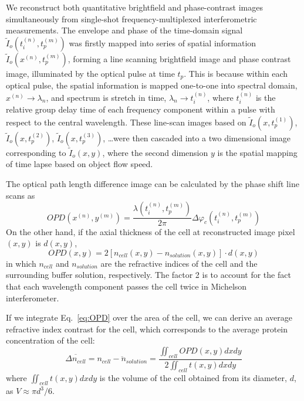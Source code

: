 \documentclass[aps,pra,reprint,longbibliography,superscriptaddress]{revtex4-1}
\begin{document}
We reconstruct both quantitative brightfield and phase-contrast images simultaneously from single-shot frequency-multiplexed interferometric measurements. The envelope and phase of the time-domain signal $\tilde{I}_o (t_i^{(n)}, t_p^{(m)})$ was firstly mapped into series of spatial information $\tilde{I}_o(x^{(n)},t_p^{(m)})$, forming a line scanning brightfield image and phase contrast image, illuminated by the optical pulse at time $t_p$. This is because within each optical pulse, the spatial information is mapped one-to-one into spectral domain, $x^{(n)} \rightarrow \lambda_n$, and spectrum is stretch in time, $\lambda_n \rightarrow t_i^{(n)}$, where $t_i^{(n)}$ is the relative group delay time of each frequency component within a pulse with respect to the central wavelength. These line-scan images based on $\tilde{I}_o(x,t_p^{(1)})$, $\tilde{I}_o (x, t_p^{(2)})$, $\tilde{I}_o(x,t_p^{(3)})$, \ldots were then cascaded into a two dimensional image corresponding to $\tilde{I}_o(x,y)$, where the second dimension $y$ is the spatial mapping of time lapse based on object flow speed. 

The optical path length difference image can be calculated by the phase shift line scans as
\begin{equation}
OPD(x^{(n)},y^{(m)}) = \frac{\lambda(t_i^{(n)},t_p^{(m)})}{2\pi} \Delta\varphi_c(t_i^{(n)},t_p^{(m)})
\end{equation}
On the other hand, if the axial thickness of the cell at reconstructed image pixel $(x,y)$ is $d(x,y)$,
\begin{equation} \label{eq:OPD}
OPD(x,y) = 2 [n_{cell}(x,y) - n_{solution}(x,y)] \cdot d(x,y)
\end{equation}
in which $n_{cell}$ and $n_{solution}$ are the refractive indices of the cell and the surrounding buffer solution, respectively. The factor 2 is to account for the fact that each wavelength component passes the cell twice in Michelson interferometer. 

If we integrate Eq.~\ref{eq:OPD} over the area of the cell, we can derive an average refractive index contrast for the cell, which corresponds to the average protein concentration of the cell:
\begin{equation}
\overline{\Delta n_{cell}} = \overline{n_{cell} - n_{solution}} = \frac{\iint_{cell} OPD(x,y) dx dy}{2 \iint_{cell} t(x,y) dx dy}
\end{equation}
where $\iint_{cell} t(x,y) dx dy$ is the volume of the cell obtained from its diameter, $d$, as $V \approx \pi d^3/6$. 
\end{document}
